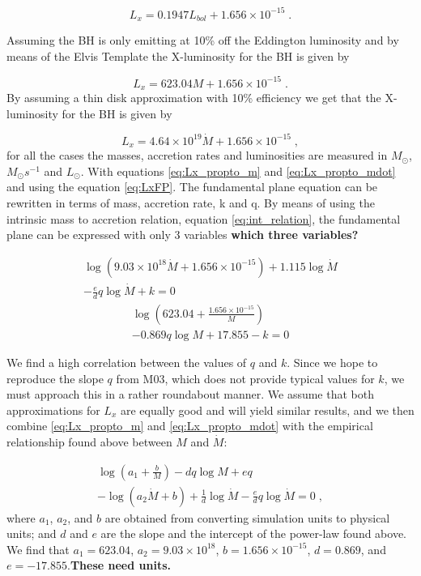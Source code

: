 \begin{equation}
L_{x}=0.1947L_{bol}+1.656\times10^{-15}\;.
\end{equation}


Assuming the BH is only emitting at 10\% off the Eddington luminosity
and by means of the Elvis Template the X-luminosity for the BH is
given by

\begin{equation}
L_{x}=623.04M+1.656\times10^{-15}\;.\label{eq:Lx_propto_m}
\end{equation}
By assuming a thin disk approximation with 10\% efficiency we get
that the X-luminosity for the BH is given by

\begin{equation}
L_{x}=4.64\times10^{19}\dot{M}+1.656\times10^{-15}\;,\label{eq:Lx_propto_mdot}
\end{equation}
for all the cases the masses, accretion rates and luminosities are
measured in $M_{\odot}$, $M_{\odot}s^{-1}$ and $L_{\odot}$. With
equations \ref{eq:Lx_propto_m} and \ref{eq:Lx_propto_mdot} and using
the equation \ref{eq:LxFP}. The fundamental plane equation can be
rewritten in terms of mass, accretion rate, k and q. By means of using
the intrinsic mass to accretion relation, equation \ref{eq:int_relation},
the fundamental plane can be expressed with only 3 variables \textbf{which 
three variables?}

\begin{multline}
\log\left(9.03\times10^{18}\dot{M}+1.656\times10^{-15}\right)+1.115\log\dot{M}\\
-\frac{e}{d}q\log\dot{M}+k=0
\end{multline}
\begin{multline}
\log\left(623.04+\frac{1.656\times10^{-15}}{M}\right)\\
-0.869q\log M+17.855-k=0
\end{multline}

We find a high correlation between the values of
$q$ and $k$. Since we hope to reproduce the slope $q$ from M03,
which does not provide typical values for $k$, we must approach this
in a rather roundabout manner. We assume that both approximations
for $L_{x}$ are equally good and will yield similar results, and we
then combine \ref{eq:Lx_propto_m} and \ref{eq:Lx_propto_mdot} with the
empirical relationship found above between $M$ and $\dot{M}$:

\begin{multline*}
\log\left(a_{1}+\frac{b}{M}\right)-dq\log M+eq\\
-\log\left(a_{2}\dot{M}+b\right)+\frac{1}{d}\log\dot{M}-\frac{e}{d}q\log\dot{M}=0\;,
\end{multline*}
where $a_{1}$, $a_{2}$, and $b$ are obtained from converting simulation
units to physical units; and $d$ and $e$ are the slope and the intercept
of the power-law found above. We find that 
$a_{1}=623.04$, $a_{2}=9.03\times10^{18}$,
$b=1.656\times10^{-15}$, $d=0.869$, and $e=-17.855$.\textbf{These
need units.}


